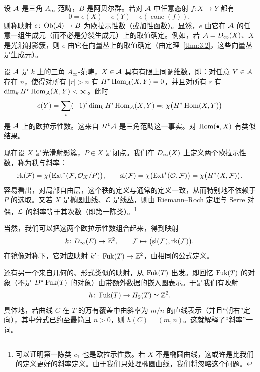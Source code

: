 设 $\mathcal{A}$ 是三角 $A_\infty$-范畴，$B$ 是阿贝尔群。若对 $\mathcal{A}$ 中任意态射 $f\colon X\to Y$ 都有
\[
0=e(X)-e(Y)+e(\operatorname{cone}(f)),
\]
则称映射 $e\colon\operatorname{Ob}(\mathcal{A})\to B$ 为欧拉示性数（或加性函数）。显然，$e$ 由它在 $\mathcal{A}$ 的任意一组生成元（而不必是分裂生成元）上的取值确定。例如，若 $\mathcal{A}=D_\infty(X)$、$X$ 是光滑射影簇，则 $e$ 由它在向量丛上的取值确定（由定理~\ref{thm:3.2}，这些向量丛是生成元）。


设 $\mathcal{A}$ 是 $k$ 上的三角 $A_\infty$-范畴，$X\in\mathcal{A}$ 具有有限上同调维数，即：对任意 $Y\in\mathcal{A}$ 存在 $n$，使得对所有 $|r|>n$ 有 $H^r\operatorname{Hom}_{\mathcal{A}}(X,Y)=0$，并且对所有 $r$ 有 $\dim_k H^r\operatorname{Hom}_{\mathcal{A}}(X,Y)<\infty$。此时
\[
e(Y)=\sum_i(-1)^i\dim_k H^i\operatorname{Hom}_{\mathcal{A}}(X,Y)=:\chi\bigl(H^*\operatorname{Hom}(X,Y)\bigr)
\]
是 $\mathcal{A}$ 上的欧拉示性数。这来自 $H^0\mathcal{A}$ 是三角范畴这一事实。对 $\operatorname{Hom}(\bullet,X)$ 有类似结果。

现在设 $X$ 是光滑射影簇，$P\in X$ 是闭点。我们在 $D_\infty(X)$ 上定义两个欧拉示性数，称为秩与斜率：
\[
\operatorname{rk}(\mathcal{F})=\chi\bigl(\operatorname{Ext}^*(\mathcal{F},\mathcal{O}_X/P)\bigr),
\qquad
\operatorname{sl}(\mathcal{F})=\chi\bigl(\operatorname{Ext}^*(\mathcal{O},\mathcal{F})\bigr)=\chi\bigl(H^*(X,\mathcal{F})\bigr).
\]
容易看出，对局部自由层，这个秩的定义与通常的定义一致，从而特别地不依赖于 $P$ 的选取。又若 $X$ 是椭圆曲线、$\mathcal{L}$ 是线丛，则由 Riemann--Roch 定理与 Serre 对偶，$\mathcal{L}$ 的斜率等于其次数（即第一陈类）。\footnote{可以证明第一陈类 $c_1$ 也是欧拉示性数。若 $X$ 不是椭圆曲线，这或许是比我们的定义更好的斜率定义。由于我们只处理椭圆曲线，我们将忽略这个问题。}


当然，我们可以把这两个欧拉示性数组合起来，得到映射
\[
k\colon D_\infty(E)\to\mathbb{Z}^2,\qquad \mathcal{F}\mapsto\bigl(\operatorname{sl}(\mathcal{F}),\operatorname{rk}(\mathcal{F})\bigr).
\]
在镜像对称下，它对应映射 $k'\colon\operatorname{Fuk}(T)\to\mathbb{Z}^2$，由相同的公式定义。

还有另一个来自几何的、形式类似的映射，从 $\operatorname{Fuk}(T)$ 出发。即回忆 $\operatorname{Fuk}(T)$ 的对象（不是 $D^\pi\operatorname{Fuk}(T)$ 的对象）由带额外数据的嵌入圆表示。于是我们有映射
\[
h\colon \operatorname{Fuk}(T)\to H_2(T)\simeq\mathbb{Z}^2.
\]
具体地，若曲线 $C$ 在 $T$ 的万有覆盖中由斜率为 $m/n$ 的直线表示（并且“朝右”定向），其中分式已约至最简且 $n>0$，则 $h(C)=(m,n)$。这就解释了“斜率”一词。

